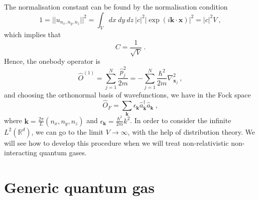    The normalisation constant can be found by the normalisation condition
    \begin{equation*}
        1 = ||u_{n_x, n_y, n_z} ||^2 = \int_V dx ~ dy ~ dz ~ |c|^2 |\exp(i \mathbf k \cdot \mathbf x)|^2 = |c|^2 V ~,
    \end{equation*}
    which implies that 
    \begin{equation*}
        C = \frac{1}{\sqrt{V}} ~.
    \end{equation*}
    Hence, the onebody operator is 
    \begin{equation*}
        \hat O^{(1)} = \sum_{j=1}^{N} \frac{\hat p^2_j}{2m} = - \sum_{j=1}^{N} \frac{\hbar^2}{2m} \nabla^2_{\mathbf x_j} ~,
    \end{equation*}
    and choosing the orthonormal basis of wavefunctions, we have in the Fock space 
    \begin{equation*}
        \hat O_F = \sum_{\mathbf k} \epsilon_{\mathbf k} \hat a^\dagger_{\mathbf k} \hat a_{\mathbf k} ~,
    \end{equation*}
    where $\mathbf k = \frac{2\pi}{L} (n_x, n_y, n_z)$ and $\epsilon_{\mathbf k} = \frac{\hbar^2}{2m} k^2$. In order to consider the infinite $L^2 (\mathbb R^d)$, we can go to the limit $V \rightarrow \infty$, with the help of distribution theory. We will see how to develop this procedure when we will treat non-relativistic non-interacting quantum gases.
    
\section{Generic quantum gas}

